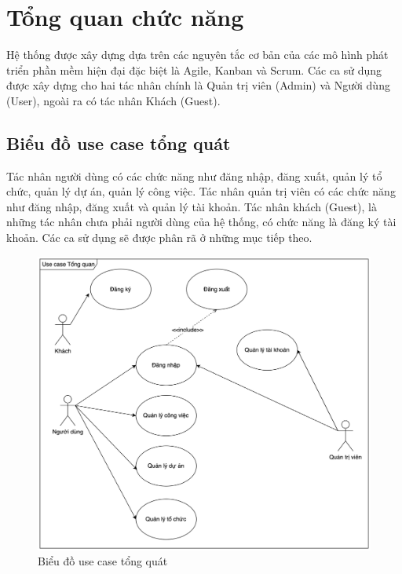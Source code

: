 \documentclass[../DoAn.tex]{subfiles}
\begin{document}
\section{Tổng quan chức năng}
\label{section:2.2}
Hệ thống được xây dựng dựa trên các nguyên tắc cơ bản của các mô hình phát triển phần mềm hiện đại đặc biệt là Agile, Kanban và Scrum.
Các ca sử dụng được xây dựng cho hai tác nhân chính là Quản trị viên (Admin) và Người dùng (User), ngoài ra có tác nhân Khách (Guest).

\subsection{Biểu đồ use case tổng quát}
\label{subsection:2.2.1}
Tác nhân người dùng có các chức năng như đăng nhập, đăng xuất, quản lý tổ chức, quản lý dự án, quản lý công việc. Tác nhân quản trị viên có các chức năng như đăng nhập,
đăng xuất và quản lý tài khoản. Tác nhân khách (Guest), là những tác nhân chưa phải người dùng của hệ thống, có chức năng là đăng ký tài khoản.
Các ca sử dụng sẽ được phân rã ở những mục tiếp theo.
\begin{figure}[H]
    \centering
    \includegraphics[width=1.0\linewidth]{Hinhve/GeneralUseCases.png}
    \caption{Biểu đồ use case tổng quát}
    \label{fig:GeneralUseCases}
\end{figure}
\newpage

\end{document}
